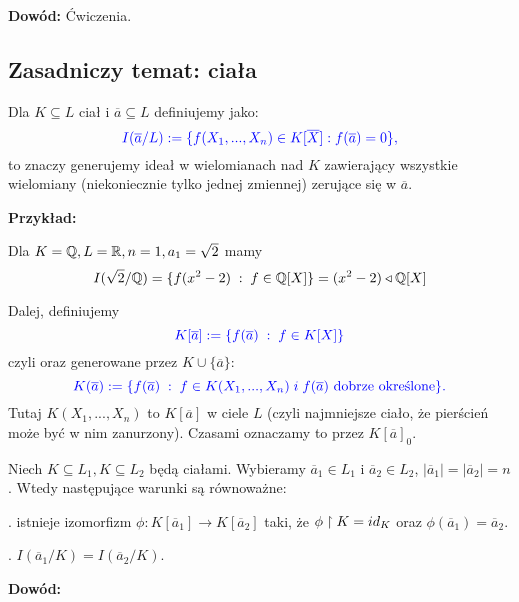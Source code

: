 \textbf{Dowód:} Ćwiczenia.

\subsection[Rozszerzenia ciał]{Zasadniczy temat: ciała}

Dla $K\subseteq L$ ciał i $\overline a\subseteq L$ definiujemy  jako:
$$\color{blue}I(\overline a /L):=\{f(X_1,...,X_n)\in K[\overline X]:f(\overline a)=0\},$$
to znaczy generujemy ideał w wielomianach nad $K$ zawierający wszystkie wielomiany (niekoniecznie tylko jednej zmiennej) zerujące się w $\overline a$. 
\medskip

\textbf{Przykład:}
\smallskip

Dla $K=\mathbb{Q},L=\mathbb{R},n=1,a_1=\sqrt{2}$ mamy
$$I(\sqrt{2}/\mathbb{Q})=\{f(x^2-2)\;:\;f\in\mathbb{Q}[X]\}=(x^2-2)\triangleleft \mathbb{Q}[X]$$

Dalej, definiujemy
$$\color{blue}K[\overline a]:=\{f(\overline a)\;:\;f\in K[X]\}$$
czyli  oraz  generowane przez $K\cup\{\overline a\}$:
$$\color{blue}K(\overline a):=\{f(\overline a)\;:\;f\in K(X_1,...,X_n)\;i\;f(\overline a)\text{ dobrze określone}\}.$$
Tutaj $K(X_1,...,X_n)$ to  $K[\overline a]$ w ciele $L$ (czyli najmniejsze ciało, że pierścień może być w nim zanurzony). Czasami oznaczamy to przez $K[\overline a]_0$.
\medskip



\begin{uwaga}
    \label{uwga:1:1:5}
    Niech $K\subseteq L_1,K\subseteq L_2$ będą ciałami. Wybieramy $\overline a_1\in L_1$ i $\overline a_2\in L_2$, $|\overline a_1|=|\overline a_2|=n$. Wtedy następujące warunki są równoważne:

. istnieje izomorfizm $\phi:K[\overline a_1]\to K[\overline a_2]$ taki, że $\phi\upharpoonright K=id_K$ oraz $\phi(\overline a_1)=\overline a_2$.

. $I(\overline a_1/K)=I(\overline a_2/K)$.
\end{uwaga}

\textbf{Dowód:}


